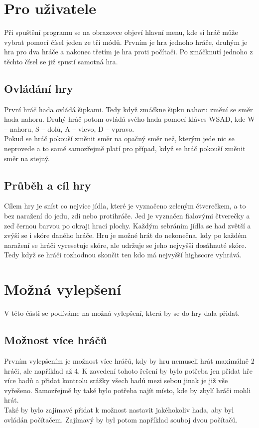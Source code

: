 \documentclass[a4paper,12pt]{report}
\begin{document}
\chapter{Pro uživatele}
Při spuštění programu se na obrazovce objeví hlavní menu, kde si hráč může vybrat pomocí čísel jeden ze tří módů. Prvním je hra jednoho hráče, druhým je hra pro dva hráče a nakonec třetím je hra proti počítači. Po zmáčknutí jednoho z těchto čísel se již spustí samotná hra.
\section{Ovládání hry}
První hráč hada ovládá šipkami. Tedy když zmáčkne šipku nahoru změní se směr hada nahoru. Druhý hráč potom ovládá svého hada pomocí kláves WSAD, kde W -- nahoru, S -- dolů, A -- vlevo, D -- vpravo.\\
Pokud se hráč pokouší změnit směr na opačný směr než, kterým jede nic se neprovede a to samé samozřejmě platí pro případ, když se hráč pokouší změnit směr na stejný.
\section{Průběh a cíl hry}
Cílem hry je sníst co nejvíce jídla, které je vyznačeno zeleným čtverečkem, a to bez naražení do jedu, zdi nebo protihráče. Jed je vyznačen fialovými čtverečky a zeď černou barvou po okraji hrací plochy. Každým sebráním jídla se had zvětší a zvýší se i skóre daného hráče. Hru je možné hrát do nekonečna, kdy po každém naražení se hráči vyresetuje skóre, ale udržuje se jeho nejvyšší dosáhnuté skóre. Tedy když se hráči rozhodnou skončit ten kdo má nejvyšší highscore vyhrává.
\chapter{Možná vylepšení}
V této části se podíváme na možná vylepšení, která by se do hry dala přidat.
\section{Možnost více hráčů}
Prvním vylepšením je možnost více hráčů, kdy by hru nemuseli hrát maximálně 2 hráči, ale například až 4. K zavedení tohoto řešení by bylo potřeba jen přidat hře více hadů a přidat kontrolu srážky všech hadů mezi sebou jinak je již vše vyřešeno. Samozřejmě by také bylo potřeba najít místo, kde by zbylí hráči mohli hrát.\\
Také by bylo zajímavé přidat k možnost nastavit jakéhokoliv hada, aby byl ovládán počítačem. Zajímavý by byl potom například souboj dvou počítačů.
\end{document}
